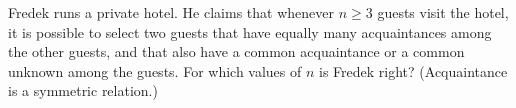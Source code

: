Fredek runs a private hotel. He claims that whenever $ n \ge 3$ guests visit the hotel, it is possible to select two guests that have equally many acquaintances among the other guests, and that also have a common acquaintance or a common unknown among the guests. For which values of $ n$ is Fredek right? (Acquaintance is a symmetric relation.)